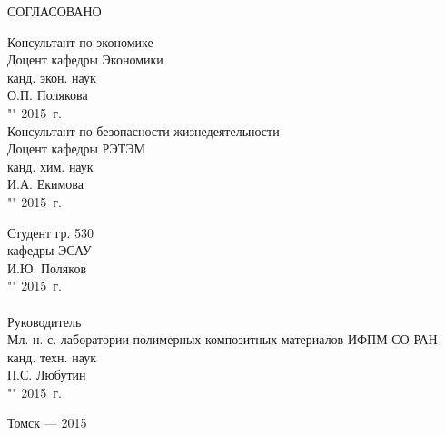 СОГЛАСОВАНО
\vspace{0.1cm}
\begin{singlespace}
 \begin{minipage}[left]{0.40\linewidth}
 Консультант по экономике\\
 Доцент кафедры Экономики \\
 канд. экон. наук\\
 \underline{\hspace{2.5cm}}О.П. Полякова \\
 "\underline{\hspace{1cm}}"\underline{\hspace{3cm}} 2015~г.\\

 Консультант по безопасности жизнедеятельности\\
 Доцент кафедры РЭТЭМ \\
 канд. хим. наук\\
 \underline{\hspace{2.5cm}}И.А. Екимова\\
 "\underline{\hspace{1cm}}"\underline{\hspace{3cm}} 2015~г.\\
 \end{minipage}
 \hfill
 \begin{minipage}[left]{0.5\linewidth}
  \vspace{0.01cm}
 Студент гр. 530 \\
 кафедры ЭСАУ \\
 \underline{\hspace{2.5cm}}И.Ю. Поляков \\
 "\underline{\hspace{1cm}}"\underline{\hspace{3cm}} 2015~г.\\
 \vspace{0.45cm}\\
 Руководитель\\
 Мл. н. с. лаборатории полимерных композитных материалов
 ИФПМ СО РАН \\
 канд. техн. наук\\
 \underline{\hspace{2.5cm}}П.С. Любутин \\
 "\underline{\hspace{1cm}}"\underline{\hspace{3cm}} 2015~г.\\
 \end{minipage}
\end{singlespace}

\vfill
\begin{center}
Томск --- 2015
\end{center}
